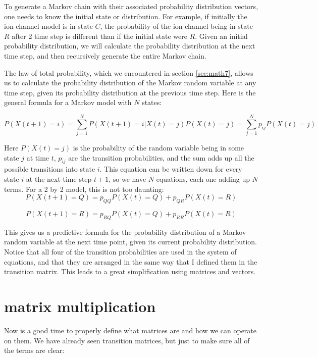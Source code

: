 \documentclass[
  letterpaper,
  DIV=11,
  numbers=noendperiod]{scrreprt}
\begin{document}
To generate a Markov chain with their associated probability
distribution vectors, one needs to know the initial state or
distribution. For example, if initially the ion channel model is in
state \(C\), the probability of the ion channel being in state \(R\)
after 2 time step is different than if the initial state were \(R\).
Given an initial probability distribution, we will calculate the
probability distribution at the next time step, and then recursively
generate the entire Markov chain.

The law of total probability, which we encountered in section
\ref{sec:math7}, allows us to calculate the probability distribution of
the Markov random variable at any time step, given its probability
distribution at the previous time step. Here is the general formula for
a Markov model with \(N\) states:

\[
P(X(t+1) = i) = \sum_{j=1}^N P(X(t+1) = i | X(t) = j )P(X(t) = j) = \sum_{j=1}^N p_{ij}P(X(t) = j)
\]

Here \(P(X(t) = j)\) is the probability of the random variable being in
some state \(j\) at time \(t\), \(p_{ij}\) are the transition
probabilities, and the sum adds up all the possible transitions into
state \(i\). This equation can be written down for every state \(i\) at
the next time step \(t+1\), so we have \(N\) equations, each one adding
up \(N\) terms. For a 2 by 2 model, this is not too daunting: \[ 
P(X(t+1) = Q) = p_{QQ}P(X(t) = Q) + p_{QR}P(X(t) = R) \]

\[ 
P(X(t+1) = R) = p_{RQ}P(X(t) = Q) + p_{RR}P(X(t) = R) 
\]

This gives us a predictive formula for the probability distribution of a
Markov random variable at the next time point, given its current
probability distribution. Notice that all four of the transition
probabilities are used in the system of equations, and that they are
arranged in the same way that I defined them in the transition matrix.
This leads to a great simplification using matrices and vectors.

\hypertarget{matrix-multiplication}{%
\section{matrix multiplication}\label{matrix-multiplication}}

Now is a good time to properly define what matrices are and how we can
operate on them. We have already seen transition matrices, but just to
make sure all of the terms are clear:
\end{document}
